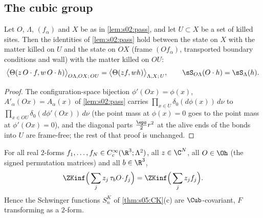 \subsection{The cubic group}

\begin{lemma}\label{lem:s06:PK}
Let $O$, $\Lambda$, $(f_\alpha)$ and $X$ be as in \cref{lem:s02:pass}, and let $U\subset X$ be a set of killed sites. Then the identities of \cref{lem:s02:pass} hold between the state on $X$ with the matter killed on $U$ and the state on $OX$ (frame $(Of_\alpha)$, transported boundary conditions and wall) with the matter killed on $OU$:
\[
\big\langle\Theta(z\,O\cdot f,w\,O\cdot h)\big\rangle_{O\Lambda,OX;\,OU}=\big\langle\Theta(zf,wh)\big\rangle_{\Lambda,X;\,U},\qquad\sS_{O\Lambda}(O\cdot h)=\sS_\Lambda(h).
\]
\end{lemma}

\begin{proof}
The configuration-space bijection $\phi'(Ox)=\phi(x)$, $A'_\alpha(Ox)=A_\alpha(x)$ of \cref{lem:s02:pass} carries $\prod_{x\in U}\delta_0(d\phi(x))\,d\nu$ to $\prod_{x\in OU}\delta_0(d\phi'(Ox))\,d\nu$ (the point mass at $\phi(x)=0$ goes to the point mass at $\phi'(Ox)=0$), and the diagonal parts $\frac\eps2r^2$ at the alive ends of the bonds into $U$ are frame-free; the rest of that proof is unchanged.
\end{proof}

\begin{theorem}\label{thm:s06:S1K}
For all real $2$-forms $f_1,\dots,f_N\in C^\infty_c(\R^3;\Lambda^2)$, all $z\in\C^N$, all $O\in\Oh$ (the signed permutation matrices) and all $b\in\R^3$,
\[
\ZKinf\Big(\sum_jz_j\,\tau_bO\!\cdot\!f_j\Big)=\ZKinf\Big(\sum_jz_jf_j\Big).
\]
Hence the Schwinger functions $S^K_n$ of \cref{thm:s05:CK}(c) are $\Cub$-covariant, $F$ transforming as a $2$-form.
\end{theorem}


